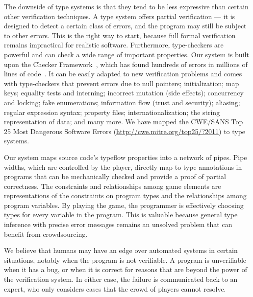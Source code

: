 \documentclass[preprint]{sig-alternate}
\newcommand{\todo}[1]{\relax}
\begin{document}
The downside of type systems is that they tend to be less expressive than
certain other verification techniques.
A type system offers partial verification --- it is designed to detect
a certain class of errors, and the program may still be subject to
other errors.  This is the right way to start, because full formal
verification remains impractical for realistic software.  Furthermore,
type-checkers are powerful and can check a wide range of important
properties.  Our system is built upon the Checker
Framework~\cite{checker-framework-website-20100203},
which has found hundreds of errors in millions of lines of
code~\cite{PapiACPE2008,DietlDEMS2011}.  It can be easily adapted to new
verification problems and comes
with type-checkers that prevent errors due to null pointers;
initialization; map keys; equality tests and interning; incorrect
mutation (side effects); concurrency and locking; fake enumerations;
information flow (trust and security); aliasing; regular expression
syntax; property files; internationalization; the string
representation of data; and many more.  We have mapped the CWE/SANS Top 25
Most Dangerous Software Errors (\url{http://cwe.mitre.org/top25/?2011})
to type systems.

Our system maps source code's typeflow properties
into a network of pipes.
Pipe widths, which are controlled by the player, directly map to type
annotations in programs that can be mechanically checked and provide a
proof of partial correctness.
The constraints and relationships among
game elements are representations of the constraints on program types and
the relationships among program variables.
By playing the game, the programmer is effectively choosing types for
every variable in the program.
This is valuable because general type inference with precise error messages
remains an unsolved problem that can benefit from crowdsourcing.

We believe that humans may have an edge over automated systems in
certain situations, notably when the program is not verifiable.  A
program is unverifiable when it has a bug, or when it is correct for
reasons that are beyond the power of the verification system.  In
either case, the failure is communicated back to an expert, who only
considers cases that the crowd of players cannot resolve.



\todo{
\medskip

The remainder of this paper is structured as follows.
\todo{Write.}}
\end{document}
